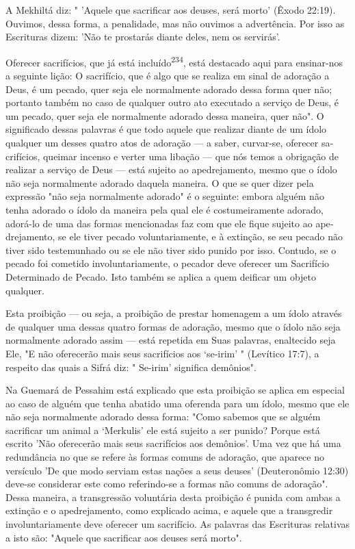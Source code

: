 A Mekhiltá diz: " 'Aquele que sacrificar aos deuses, será morto' (Êxo­do
22:19). Ouvimos, dessa forma, a penalidade, mas não ouvimos a
advertên­cia. Por isso as Escrituras dizem: 'Não te prostarás diante
deles, nem os servirás'.



Oferecer sacrifícios, que já está incluído\textsuperscript{234}, está
destacado aqui para ensinar-nos a seguinte lição: O sacrifício, que é
algo que se realiza em sinal de adoração a Deus, é um pecado, quer seja
ele normalmente adorado dessa forma quer não; portanto também no caso de
qualquer outro ato executado a serviço de Deus, é um pecado, quer seja
ele normalmente adorado dessa maneira, quer não". O significado dessas
palavras é que todo aquele que realizar diante de um ídolo qualquer um
desses quatro atos de adoração --- a saber, curvar-se, oferecer
sa­crifícios, queimar incenso e verter uma libação --- que nós temos a
obrigação de realizar a serviço de Deus --- está sujeito ao
apedrejamento, mesmo que o ídolo não seja normalmente adorado daquela
maneira. O que se quer dizer pela expressão "não seja normalmente
adorado" é o seguinte: embora alguém não tenha adorado o ídolo da
maneira pela qual ele é costumeiramente adorado, adorá-lo de uma das
formas mencionadas faz com que ele fique sujeito ao ape­drejamento, se
ele tiver pecado voluntariamente, e à extinção, se seu pecado não tiver
sido testemunhado ou se ele não tiver sido punido por isso. Contudo, se
o pecado foi cometido involuntariamente, o pecador deve oferecer um
Sa­crifício Determinado de Pecado. Isto também se aplica a quem deificar
um ob­jeto qualquer.

Esta proibição --- ou seja, a proibição de prestar homenagem a um ídolo
através de qualquer uma dessas quatro formas de adoração, mesmo que o
ídolo não seja normalmente adorado assim --- está repetida em Suas
palavras, enaltecido seja Ele, "E não oferecerão mais seus sacrifícios
aos `se-irim' " (Leví­tico 17:7), a respeito das quais a Sifrá diz: "
Se-irim' significa demônios".

Na Guemará de Pessahim está explicado que esta proibição se aplica em
especial ao caso de alguém que tenha abatido uma oferenda para um ídolo,
mesmo que ele não seja normalmente adorado dessa forma: "Como sabemos
que se alguém sacrificar um animal a `Merkulis' ele está sujeito a ser
punido? Por­que está escrito 'Não oferecerão mais seus sacrifícios aos
demônios'. Uma vez que há uma redundância no que se refere às formas
comuns de adoração, que aparece no versículo 'De que modo serviam estas
nações a seus deuses' (Deute­ronômio 12:30) deve-se considerar este como
referindo-se a formas não comuns de adoração". Dessa maneira, a
transgressão voluntária desta proibição é puni­da com ambas a extinção e
o apedrejamento, como explicado acima, e aquele que a transgredir
involuntariamente deve oferecer um sacrifício. As palavras das
Escrituras relativas a isto são: "Aquele que sacrificar aos deuses será
morto".


